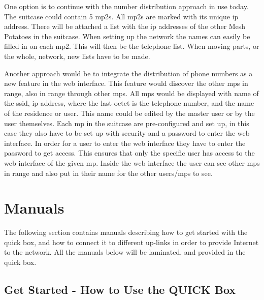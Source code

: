 One option is to continue with the number distribution approach in use today. The suitcase could contain 5 \glspl{mp2}. All \glspl{mp2} are marked with its unique \gls{ip} address. There will be attached a list with the \gls{ip} addresses of the other Mesh Potatoes in the suitcase. When setting up the network the names can easily be filled in on each \gls{mp2}. This will then be the telephone list. When moving parts, or the whole, network, new lists have to be made. 

Another approach would be to integrate the distribution of phone numbers as a new feature in the web interface. This feature would discover the other \glspl{mp} in range, also in range through other \glspl{mp}. All \glspl{mp} would be displayed with name of the \gls{ssid}, \gls{ip} address, where the last octet is the telephone number, and the name of the residence or user. This name could be edited by the master user or by the user themselves. Each \gls{mp} in the suitcase are pre-configured and set up, in this case they also have to be set up with security and a password to enter the web interface. In order for a user to enter the web interface they have to enter the password to get access. This ensures that only the specific user has access to the web interface of the given \gls{mp}. Inside the web interface the user can see other \glspl{mp} in range and also put in their name for the other users/\glspl{mp} to see. 



\section{Manuals}
The following section contains manuals describing how to get started with the \gls{quick} box, and how to connect it to different up-links in order to provide Internet to the network. All the manuals below will be laminated, and provided in the \gls{quick} box. 
\clearpage
\subsection{Get Started - How to Use the QUICK Box}

\clearpage
